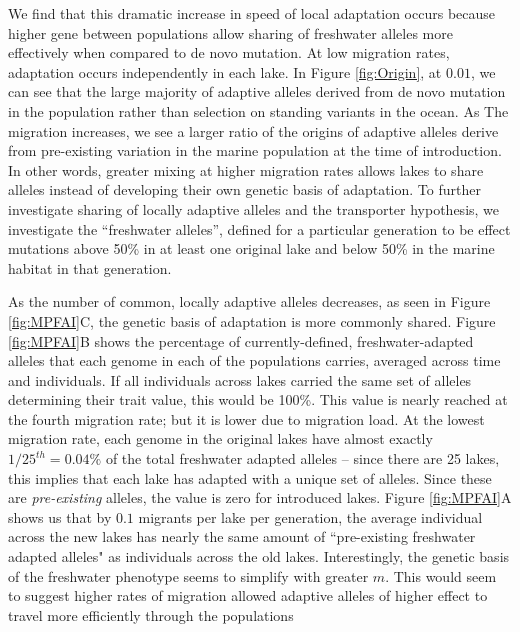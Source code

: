 \documentclass{article}
\newcommand{\jgg}[1]{\todo[linecolor=green,backgroundcolor=green!25,bordercolor=black]{#1}}
\begin{document}
We find that this dramatic increase in speed of local adaptation occurs because
higher gene between populations allow sharing of freshwater alleles more effectively when compared to de novo mutation.
At low migration rates, adaptation occurs independently in each lake.
In Figure \ref{fig:Origin}, at $0.01$, we can see that the large majority of adaptive alleles derived from de novo mutation in the 
population rather than selection on standing variants in the ocean. 
As The migration increases, we see a larger ratio of the origins of adaptive alleles 
derive from pre-existing variation in the marine population at the time of introduction.
In other words, 
greater mixing at higher migration rates allows lakes to share alleles
instead of developing their own genetic basis of adaptation.
To further investigate sharing of locally adaptive alleles and the transporter hypothesis,
we investigate the ``freshwater alleles'', defined for a particular generation
to be effect mutations above 50\% in at least one original lake and below 50\% in the marine habitat in that generation.

As the number of common, locally adaptive alleles decreases, as seen in Figure \ref{fig:MPFAI}C,
the genetic basis of adaptation is more commonly shared.
Figure \ref{fig:MPFAI}B shows
the percentage of currently-defined, freshwater-adapted alleles 
that each genome in each of the populations carries,
averaged across time and individuals.
If all individuals across lakes carried the same set of alleles determining their trait value,
this would be 100\%.
This value is nearly reached at the fourth migration rate;
but it is lower due to migration load.
At the lowest migration rate, 
each genome in the original lakes have almost exactly $1/25^{th} = 0.04\%$   
of the total freshwater adapted alleles --
since there are 25 lakes, this implies that each lake has adapted with a unique set of alleles.
Since these are \emph{pre-existing} alleles, the value is zero for introduced lakes.
Figure \ref{fig:MPFAI}A shows us that by $0.1$ migrants per lake per generation,
the average individual across the new lakes has nearly the same amount of 
``pre-existing freshwater adapted alleles" as individuals across the old lakes.
Interestingly, the genetic basis of the freshwater phenotype 
seems to simplify with greater $m$. 
This would seem to suggest higher rates of migration allowed 
adaptive alleles of higher effect to travel more efficiently through the populations
\jgg{is this right?}
\end{document}
